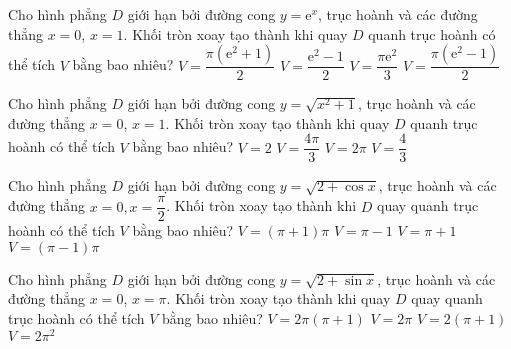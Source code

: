 \begin{ex}%
Cho hình phẳng $D$ giới hạn bởi đường cong $y=\mathrm{e}^x$, trục hoành và các đường thẳng $x=0$, $x=1$. Khối tròn xoay tạo thành khi quay $D$ quanh trục hoành có thể tích $V$ bằng bao nhiêu?
\choice
{$V=\dfrac{\pi\left(\mathrm{e}^2+1\right)}{2}$}
{$V=\dfrac{\mathrm{e}^2-1}{2}$}
{$V=\dfrac{\pi \mathrm{e}^2}{3}$}
{\True $V=\dfrac{\pi\left(\mathrm{e}^2-1\right)}{2}$}
\end{ex}

\begin{ex}%
Cho hình phẳng $D$ giới hạn bởi đường cong $y=\sqrt{x^2+1}$, trục hoành và các đường thẳng $x=0$, $x=1$. Khối tròn xoay tạo thành khi quay $D$ quanh trục hoành có thể tích $V$ bằng bao nhiêu?
\choice
{$ V=2 $}
{\True $V=\dfrac{4 \pi}{3} $}
{$V=2 \pi$}
{$V=\dfrac{4}{3}$}
\end{ex}

\begin{ex}%
Cho hình phẳng $D$ giới hạn bởi đường cong $y=\sqrt{2+\cos x}$, trục hoành và các đường thẳng $x=0, x=\dfrac{\pi}{2}$. Khối tròn xoay tạo thành khi $D$ quay quanh trục hoành có thể tích $V$ bằng bao nhiêu?
\choice
{\True $V=(\pi+1) \pi$}
{$V=\pi-1$}
{$V=\pi+1$}
{$V=(\pi-1) \pi$}
\end{ex}

\begin{ex}%
Cho hình phẳng $D$ giới hạn bởi đường cong $y=\sqrt{2+\sin x}$, trục hoành và các đường thẳng $x=0$, $ x=\pi$. Khối tròn xoay tạo thành khi quay $D$ quay quanh trục hoành có thể tích $V$ bằng bao nhiêu?
\choice
{\True $V=2 \pi(\pi+1)$}
{$V=2 \pi$}
{$V=2(\pi+1)$}
{$V=2 \pi^2$}
\end{ex}

